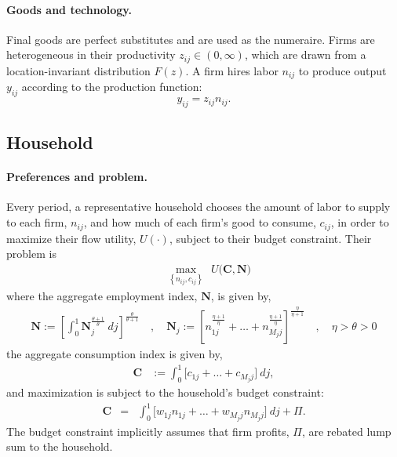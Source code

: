 \documentclass[12pt]{article}
\theoremstyle{prop}
\begin{document}
\paragraph{Goods and technology.}
Final goods are perfect substitutes and are used as the numeraire.
Firms are heterogeneous in their productivity $z_{ij}\in(0,\infty)$, which are drawn from a location-invariant distribution $F(z)$.
A firm hires labor $n_{ij}$ to produce output $y_{ij}$ according to the production function:
\begin{equation*}
	y_{ij} = z_{ij} n_{ij}.
\end{equation*}

\subsection{Household}

\paragraph{Preferences and problem.}
Every period, a representative household chooses the amount of labor to supply to each firm, $n_{ij}$,  and how much of each firm's good to consume, $c_{ij}$, in order to maximize their flow utility, $U(\cdot)$, subject to their budget constraint.
Their problem is
 \begin{align}\label{eq:u0}
	 & \max_{\left\{n_{ij},c_{ij} \right\}}\:\:  U\Big(\mathbf{C} ,\mathbf{N} \Big)
 \end{align}
where the aggregate employment index, $\mathbf{N}$, is given by,
\begin{align*}
	\mathbf{N}  :=  \left[\int_0^1 \mathbf{N}_{j}^{\frac{\theta+1}{\theta}}\:dj\right]^{\frac{\theta}{\theta+1}}
    \quad,\quad 
	\mathbf{N}_{j} := \left[n_{1j}^{\frac{\eta+1}{\eta}}+\dots + n_{M_{j}j}^{\frac{\eta+1}{\eta}}\right]^{\frac{\eta}{\eta+1}}
 \quad,\quad
 \eta>\theta>0
\end{align*}
the aggregate consumption index is given by,
\begin{align*}
	\mathbf{C}  & :=  	  \int_0^1 \Big[c_{1j}+\dots + c_{M_{j}j}\Big] \:dj,
\end{align*}
and maximization is subject to the household's budget constraint:
\vspace*{-.2cm}\begin{eqnarray}\label{eq:bc}	
	\mathbf{C} &=& \int_0^1 \Big[w_{1j}n_{1j}+\dots + w_{M_{j}j}n_{M_{j}j}\Big]\:dj   + \Pi.
 \end{eqnarray}
The budget constraint implicitly assumes that firm profits, $\Pi$, are rebated lump sum to the household.
\end{document}
